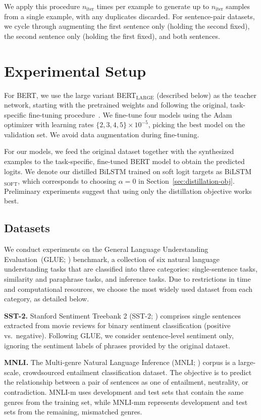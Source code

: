 \documentclass[11pt,a4paper]{article}
\newcommand{\parheader}[1]{{\smallskip \noindent \bf #1.}}
\begin{document}
We apply this procedure $n_{\text{iter}}$ times per example to generate up to $n_\text{iter}$ samples from a single example, with any duplicates discarded. 
For sentence-pair datasets, we cycle through augmenting the first sentence only (holding the second fixed), the second sentence only (holding the first fixed), and both sentences.


\section{Experimental Setup}
For BERT, we use the large variant BERT$_\text{LARGE}$ (described below) as the teacher network, starting with the pretrained weights and following the original, task-specific fine-tuning procedure~\cite{devlin2018bert}.
We fine-tune four models using the Adam optimizer with learning rates $\{2, 3, 4, 5\}\times10^{-5}$, picking the best model on the validation set.
We avoid data augmentation during fine-tuning.

For our models, we feed the original dataset together with the synthesized examples to the task-specific, fine-tuned BERT model to obtain the predicted logits.
We denote our distilled BiLSTM trained on soft logit targets as BiLSTM$_\text{SOFT}$, which corresponds to choosing $\alpha = 0$ in Section~\ref{sec:distillation-obj}.
Preliminary experiments suggest that using only the distillation objective works best.


\subsection{Datasets}


We conduct experiments on the General Language Understanding Evaluation~(GLUE; \citealp{wang2018glue}) benchmark, a collection of six natural language understanding tasks that are classified into three categories: single-sentence tasks, similarity and paraphrase tasks, and inference tasks. Due to restrictions in time and computational resources, we choose the most widely used dataset from each category, as detailed below.

\parheader{SST-2}
Stanford Sentiment Treebank 2 (SST-2; \citealp{socher2013recursive}) comprises single sentences extracted from movie reviews for binary sentiment classification (positive vs.~negative). Following GLUE, we consider sentence-level sentiment only, ignoring the sentiment labels of phrases provided by the original dataset.


\parheader{MNLI}
The Multi-genre Natural Language Inference (MNLI; \citealp{williams2017broad}) corpus is a large-scale, crowdsourced entailment classification dataset. 
The objective is to predict the relationship between a pair of sentences as one of entailment, neutrality, or contradiction.
\mbox{MNLI-m} uses development and test sets that contain the same genres from the training set, while \mbox{MNLI-mm} represents development and test sets from the remaining, mismatched genres.
\end{document}
